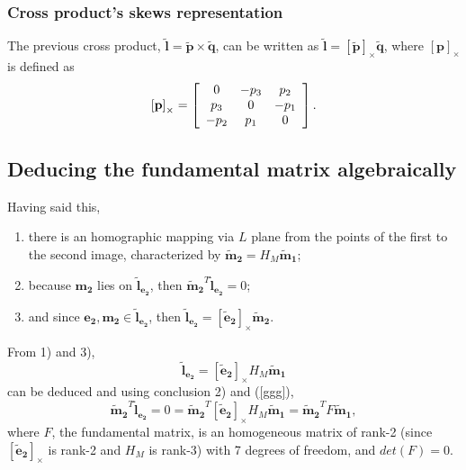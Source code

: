 \subsubsection{Cross product's \gls{skews} representation}
The previous cross product, $\mathbf{\tilde{l}} = \mathbf{\tilde{p}} \times \mathbf{\tilde{q}}$, can be written as $\mathbf{\tilde{l}} = [\mathbf{\tilde{p}}]_{\times} \mathbf{\tilde{q}}$, where $[\mathbf{p}]_{\times}$ is defined as
\begin{equation}
\label{sec2:eq:crossp}
\left[ \mathbf{p} \right]_ { \times } =  \left[ \begin{array} { c c c } { 0 } & { - p_ { 3 } } & { p_{ 2 } } \\ { p_{ 3 } } & { 0 } & { - p_{ 1 } } \\ { - p _ { 2 } } & { p_ { 1 } } & { 0 } \end{array} \right].
\end{equation}

\subsection{Deducing the fundamental matrix algebraically}

Having said this,
\begin{enumerate}
	\item there is an homographic mapping via $L$ plane from the points of the first to the second image, characterized by $\mathbf{\tilde{m}_2} = H_M \mathbf{\tilde{m}_1}$;
	\item because $\mathbf{m_2}$ lies on $\mathbf{\tilde{l}_{e_2}}$, then $\mathbf{ \tilde{m}_2 } ^T \mathbf{\tilde{l}_{e_2}} = 0$;
	\item and since $\mathbf { e_2 }, \mathbf { m_2 } \in \mathbf{\tilde{l}_{e_2}}$, then $\mathbf{\tilde{l}_{e_2}} = [\mathbf{\tilde{e}_2}]_{\times} \mathbf{\tilde{m}_2}$.
\end{enumerate}
From 1) and 3), 
\begin{equation}
\label{ggg}
\mathbf{\tilde{l}_{e_2}} = [\mathbf{\tilde{e}_2}]_{\times} H_M \mathbf{\tilde{m}_1} 
\end{equation}
can be deduced and using conclusion 2) and (\ref{ggg}),
\begin{equation}
\label{sec2:eq:fundm}
\mathbf{\tilde{m}_2}^T \mathbf{\tilde{l}_{e_2}} = 0 = \mathbf{\tilde{m}_2}^T [\mathbf{\tilde{e}_2}]_{\times} H_M \mathbf{\tilde{m}_1}  = \mathbf{\tilde{m}_2}^T F \mathbf{\tilde{m}_1},
\end{equation}
where $F$, the fundamental matrix, is an homogeneous matrix of rank-2 (since $[\mathbf{\tilde{e}_2}]_{\times}$ is rank-2 and $H_M$ is rank-3) with 7 degrees of freedom, and $det(F) = 0$.

